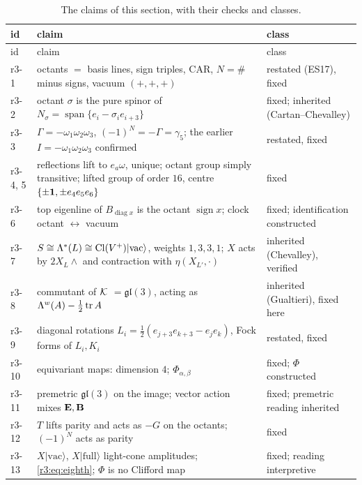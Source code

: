 {\small\renewcommand{\arraystretch}{1.12}
\begin{longtable}{@{}>{\raggedright\arraybackslash}p{}>{\raggedright\arraybackslash}p{}>{\raggedright\arraybackslash}p{}@{}}
\caption{The claims of this section, with their checks and classes.}\label{r3:tab:claims}\\
\toprule
id & claim & class\\
\midrule
\endfirsthead
\toprule
id & claim & class\\
\midrule
\endhead
r3-1 & octants $=$ basis lines, sign triples, CAR, $N=\#$ minus signs, vacuum $(+,+,+)$ & restated (ES17), fixed\\
r3-2 & octant $\sigma$ is the pure spinor of $N_\sigma=\operatorname{span}\{e_i-\sigma_ie_{i+3}\}$ & fixed; inherited (Cartan--Chevalley)\\
r3-3 & $\Gamma=-\omega_1\omega_2\omega_3$, $(-1)^N=-\Gamma=\gamma_5$; the earlier $I=-\omega_1\omega_2\omega_3$ confirmed & restated, fixed\\
r3-4, 5 & reflections lift to $e_a\omega$, unique; octant group simply transitive; lifted group of order $16$, centre $\{\pm\mathbf 1,\pm e_4e_5e_6\}$ & fixed\\
r3-6 & top eigenline of $B_{\operatorname{diag}x}$ is the octant $\operatorname{sign}x$; clock octant $\leftrightarrow$ vacuum & fixed; identification constructed\\
r3-7 & $S\cong\Lambda^*(L)\cong\mathrm{Cl}(V^+)|\mathrm{vac}\rangle$, weights $1,3,3,1$; $X$ acts by $2X_L\wedge$ and contraction with $\eta(X_{L'},\cdot)$ & inherited (Chevalley), verified\\
r3-8 & commutant of $\mathcal K$ $=\mathfrak{gl}(3)$, acting as $\Lambda^w(A)-\tfrac12\operatorname{tr} A$ & inherited (Gualtieri), fixed here\\
r3-9 & diagonal rotations $L_i=\tfrac12(e_{j+3}e_{k+3}-e_je_k)$, Fock forms of $L_i,K_i$ & restated, fixed\\
r3-10 & equivariant maps: dimension $4$; $\Phi_{\alpha,\beta}$ & fixed; $\Phi$ constructed\\
r3-11 & premetric $\mathfrak{gl}(3)$ on the image; vector action mixes $\mathbf E,\mathbf B$ & fixed; premetric reading inherited\\
r3-12 & $T$ lifts parity and acts as $-G$ on the octants; $(-1)^N$ acts as parity & fixed\\
r3-13 & $X|\mathrm{vac}\rangle$, $X|\mathrm{full}\rangle$ light-cone amplitudes; \cref{r3:eq:eighth}; $\Phi$ is no Clifford map & fixed; reading interpretive\\

\end{longtable}}
